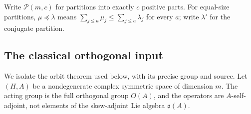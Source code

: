 \documentclass[11pt,reqno]{amsart}
\numberwithin{equation}{section}
\theoremstyle{definition}\newtheorem{definition}[theorem]{Definition}
\theoremstyle{remark}\newtheorem{remark}[theorem]{Remark}
\begin{document}
Write \(\mathcal P(m,c)\) for partitions into exactly \(c\)
positive parts. For equal-size partitions, \(\mu\preceq\lambda\)
means \(\sum_{j\le a}\mu_j\le\sum_{j\le a}\lambda_j\)
for every \(a\); write \(\lambda'\) for the conjugate partition.

\subsection{The classical orthogonal input}
\label{sec:orthogonal-input-v145}

We isolate the orbit theorem used below, with its precise group and
source.  Let \((H,A)\) be a nondegenerate complex symmetric space of
dimension \(m\).  The acting group is the full orthogonal group
\(O(A)\), and the operators are \(A\)-self-adjoint, not elements
of the skew-adjoint Lie algebra \(\mathfrak o(A)\).
\end{document}
